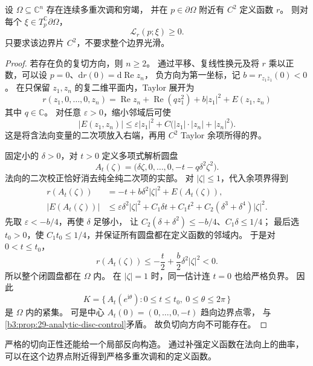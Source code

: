 \begin{theorem}[伪凸域的边界必要条件]\label{b3:thm:29-pseudoconvex-levi}
设 \(\Omega\subseteq\mathbb C^n\) 存在连续多重次调和穷竭，
并在 \(p\in\partial\Omega\) 附近有 \(C^2\) 定义函数 \(r\)。
则对每个 \(\xi\in T_p^{\mathbb C}\partial\Omega\)，
\[
 \mathcal L_r(p;\xi)\ge0.
\]
只要求该边界片 \(C^2\)，不要求整个边界光滑。
\end{theorem}
\begin{proof}
若存在负的复切方向，则 \(n\ge2\)。
通过平移、复线性换元及将 \(r\) 乘以正数，可以设
\(p=0\)、\(\mathrm dr(0)=\mathrm d\operatorname{Re}z_n\)，
负方向为第一坐标，记 \(b=r_{z_1\bar z_1}(0)<0\)。
在只保留 \(z_1,z_n\) 的复二维平面内，Taylor 展开为
\[
 r(z_1,0,\ldots,0,z_n)
 =\operatorname{Re}z_n+\operatorname{Re}(qz_1^2)+b|z_1|^2+E(z_1,z_n)
\]
其中 \(q\in\mathbb C\)。
对任意 \(\varepsilon>0\)，缩小邻域后可使
\[
 |E(z_1,z_n)|
 \le\varepsilon|z_1|^2+C\bigl(|z_1|\cdot|z_n|+|z_n|^2\bigr).
\]
这是将含法向变量的二次项放入右端，再用 \(C^2\) Taylor 余项所得的界。

固定小的 \(\delta>0\)，对 \(t>0\) 定义多项式解析圆盘
\[
 A_t(\zeta)=
 \bigl(\delta\zeta,0,\ldots,0,-t-q\delta^2\zeta^2\bigr).
\]
法向的二次校正恰好消去纯全纯二次项的实部。
对 \(|\zeta|\le1\)，代入余项界得到
\[
 \begin{aligned}
 r(A_t(\zeta))&=-t+b\delta^2|\zeta|^2+E(A_t(\zeta)),\\
 |E(A_t(\zeta))|
 &\le\varepsilon\delta^2|\zeta|^2
       +C_1\delta t+C_1t^2
       +C_2(\delta^3+\delta^4)|\zeta|^2.
 \end{aligned}
\]
先取 \(\varepsilon<-b/4\)，再使 \(\delta\) 足够小，
让 \(C_2(\delta+\delta^2)\le-b/4\)、\(C_1\delta\le1/4\)；
最后选 \(t_0>0\)，使 \(C_1t_0\le1/4\)，并保证所有圆盘都在定义函数的邻域内。
于是对 \(0<t\le t_0\)，
\[
 r(A_t(\zeta))\le-\frac t2+\frac b2\delta^2|\zeta|^2<0.
\]
所以整个闭圆盘都在 \(\Omega\) 内。
在 \(|\zeta|=1\) 时，同一估计连 \(t=0\) 也给严格负界。
因此
\[
 K=\{\,A_t(e^{\mathrm i\theta}):0\le t\le t_0,\ 0\le\theta\le2\pi\,\}
\]
是 \(\Omega\) 内的紧集。
可是中心 \(A_t(0)=(0,\ldots,0,-t)\) 趋向边界点零，
与\cref{b3:prop:29-analytic-disc-control}矛盾。
故负切向方向不可能存在。
\end{proof}

严格的切向正性还能给一个局部反向构造。
通过补强定义函数在法向上的曲率，可以在这个边界点附近得到严格多重次调和的定义函数。

